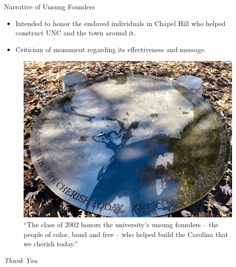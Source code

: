 \documentclass[10pt]{beamer}
\begin{document}
\begin{frame}{Narrative of Unsung Founders}
    \begin{minipage}{0.5\textwidth}
        \begin{itemize}
            \item Intended to honor the enslaved individuals in Chapel Hill who helped construct UNC and the town around it.
            \item Criticism of monument regarding its effectiveness and message. 
        \end{itemize}
    \end{minipage}
    \begin{minipage}{0.4\textwidth}
   
    \begin{figure}
        \includegraphics[scale = 0.3]{photos/photo3.png}
        \caption{ “The class of 2002 honors the university’s unsung founders – the people of color, bond and free – who helped build the Carolina that we cherish today.”}
    \end{figure}
     \vspace{-2.4cm}
    \end{minipage}
\end{frame}



\begin{frame}{}
  \centering \Large
  \emph{Thank You}
\end{frame}
\end{document}
